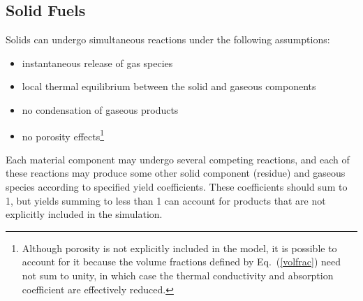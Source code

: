 \subsection{Solid Fuels}

Solids can undergo simultaneous reactions under the following assumptions:
\begin{itemize}
\setlength{\itemsep}{0.0in}
\item instantaneous release of gas species
\item local thermal equilibrium between the solid and gaseous components
\item no condensation of gaseous products
\item no porosity effects\footnote{Although porosity is not explicitly included in the model, it is possible to account for it because the volume fractions defined by Eq.~(\ref{volfrac}) need not sum to unity, in which case the thermal conductivity and absorption coefficient are effectively reduced.}
\end{itemize}
Each material component may undergo several competing reactions, and each of these reactions may produce some other solid component (residue) and gaseous species according to specified yield coefficients.  These coefficients should sum to 1, but yields summing to less than 1 can account for products that are not explicitly included in the simulation.

